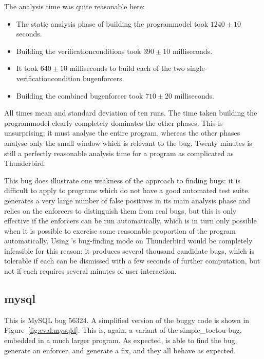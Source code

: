 The analysis time was quite reasonable here:

\begin{itemize}
\item The static analysis phase of building the \gls{programmodel}
  took $1240 \pm 10$ seconds.
\item Building the \glspl{verificationcondition} took $390 \pm 10$
  milliseconds.
\item It took $640 \pm 10$ milliseconds to build each of the two
  single-\gls{verificationcondition} \glspl{bugenforcer}.
\item Building the combined \gls{bugenforcer} took $710 \pm 20$
  milliseconds.
\end{itemize}

All times mean and standard deviation of ten runs.  The time taken
building the \gls{programmodel} clearly completely dominates the other
phases.  This is unsurprising; it must analyse the entire program,
whereas the other phases analyse only the small window which is
relevant to the bug.  Twenty minutes is still a perfectly reasonable
analysis time for a program as complicated as Thunderbird.

This bug does illustrate one weakness of the {\technique} approach to
finding bugs: it is difficult to apply to programs which do not have a
good automated test suite.  {\Technique} generates a very large number
of false positives in its main analysis phase and relies on the
enforcers to distinguish them from real bugs, but this is only
effective if the enforcers can be run automatically, which is in turn
only possible when it is possible to exercise some reasonable
proportion of the program automatically.  Using {\technique}'s
bug-finding mode on Thunderbird would be completely infeasible for
this reason: it produces several thousand candidate bugs, which is
tolerable if each can be dismissed with a few seconds of further
computation, but not if each requires several minutes of user
interaction.

\subsection{mysql}
\label{sect:eval:mysql}

This is MySQL bug 56324\needCite{}.  A simplified version of the buggy
code is shown in Figure~\ref{fig:eval:mysqld}.  This is, again, a
variant of the simple\_toctou bug, embedded in a much larger program.
As expected, {\implementation} is able to find the bug, generate an
enforcer, and generate a fix, and they all behave as expected.

